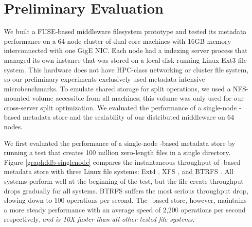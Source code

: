 \section{Preliminary Evaluation}

We built a FUSE-based middleware filesystem prototype and tested its metadata
performance on a
64-node cluster of dual core machines with 16GB memory interconnected with one 
GigE NIC.
Each node had a \giga{} indexing server process that managed its own \ldb instance 
that was stored on a local disk running Linux Ext3 file system.
This hardware does not have HPC-class networking or cluster file system, so our
preliminary experiments exclusively used metadata-intensive microbenchmarks.
To emulate shared storage for split operations, we used a NFS-mounted
volume accessible from all machines; this volume was only used for 
our cross-server \ldb split optimization.
We evaluated the performance of a single-node \ldb-based metadata store and
the scalability of our distributed middleware on 64 nodes.

We first evaluated the performance of a single-node \ldb-based metadata store
by running a test that creates 100 million zero-length files in a single
directory.
Figure \ref{graph:ldb-singlenode} compares the instantaneous throughput of \ldb-based metadata 
store with three Linux file systems: Ext4 \cite{Ext4}, XFS \cite{XFS}, and
BTRFS \cite{BTRFS}.
All systems perform well at the beginning of the test, but the file create
throughput drops gradually for all systems. 
BTRFS suffers the most serious throughput drop, slowing down to 100 operations 
per second. 
The \ldb-based store, however, maintains a more steady performance 
with an average speed of 2,200 operations per second respectively,
\textit{and is 10X faster than all other tested file systems.}

